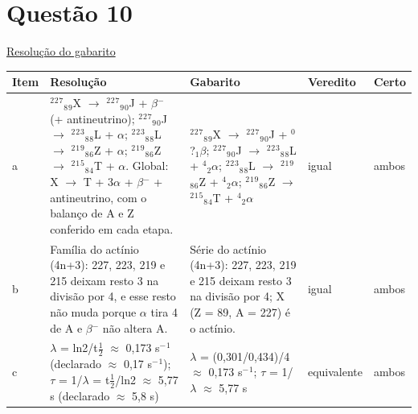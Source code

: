 \documentclass{article}%
\begin{document}
\section*{Questão 10}%
\href{https://poliedroresolve.sistemapoliedro.com.br/vestibulares/ime/2026/ime-2-fase-dia-3-25-10-2025-2-fase-dia-3/dissertativa-10-quimica-2-fase-dia-3-ime-2026}{Resolução do gabarito}\par\smallskip%
\begin{longtable}{@{}p{} p{} p{} p{} p{}@{}}\toprule Item & Resolução & Gabarito & Veredito & Certo \\ \midrule
a & $^2$$^2$$^{7}$$_{8}$$_{9}$X $\to$ $^2$$^2$$^{7}$$_{9}$$_{0}$J + $\beta$$^{-}$ (+ antineutrino); $^2$$^2$$^{7}$$_{9}$$_{0}$J $\to$ $^2$$^2$$^3$$_{8}$$_{8}$L + $\alpha$; $^2$$^2$$^3$$_{8}$$_{8}$L $\to$ $^2$$^{1}$$^{9}$$_{8}$$_{6}$Z + $\alpha$; $^2$$^{1}$$^{9}$$_{8}$$_{6}$Z $\to$ $^2$$^{1}$$^{5}$$_{8}$$_{4}$T + $\alpha$. Global: X $\to$ T + 3$\alpha$ + $\beta$$^{-}$ + antineutrino, com o balanço de A e Z conferido em cada etapa. & $^2$$^2$$^{7}$$_{8}$$_{9}$X $\to$ $^2$$^2$$^{7}$$_{9}$$_{0}$J + $^{0}$?$_{1}$$\beta$; $^2$$^2$$^{7}$$_{9}$$_{0}$J $\to$ $^2$$^2$$^3$$_{8}$$_{8}$L + $^{4}$$_{2}$$\alpha$; $^2$$^2$$^3$$_{8}$$_{8}$L $\to$ $^2$$^{1}$$^{9}$$_{8}$$_{6}$Z + $^{4}$$_{2}$$\alpha$; $^2$$^{1}$$^{9}$$_{8}$$_{6}$Z $\to$ $^2$$^{1}$$^{5}$$_{8}$$_{4}$T + $^{4}$$_{2}$$\alpha$ & igual & ambos \\
b & Família do actínio (4n+3): 227, 223, 219 e 215 deixam resto 3 na divisão por 4, e esse resto não muda porque $\alpha$ tira 4 de A e $\beta$$^{-}$ não altera A. & Série do actínio (4n+3): 227, 223, 219 e 215 deixam resto 3 na divisão por 4; X (Z = 89, A = 227) é o actínio. & igual & ambos \\
c & $\lambda$ = ln2/t$\frac12$ $\approx$ 0,173 s$^{-}$$^{1}$ (declarado $\approx$ 0,17 s$^{-}$$^{1}$); $\tau$ = 1/$\lambda$ = t$\frac12$/ln2 $\approx$ 5,77 s (declarado $\approx$ 5,8 s) & $\lambda$ = (0,301/0,434)/4 $\approx$ 0,173 s$^{-}$$^{1}$; $\tau$ = 1/$\lambda$ $\approx$ 5,77 s & equivalente & ambos \\
\bottomrule\end{longtable}%
\end{document}
